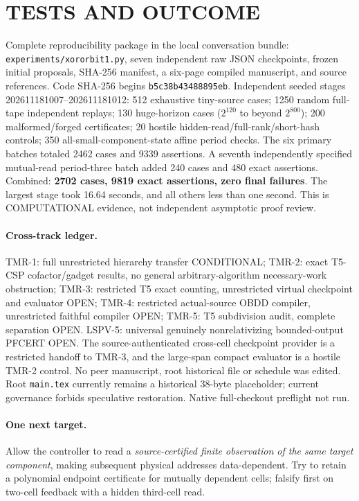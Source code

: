 \documentclass[11pt]{article}
\begin{document}
\section{TESTS AND OUTCOME}
Complete reproducibility package in the local conversation bundle:
\texttt{experiments/xororbit1.py}, seven independent raw JSON
checkpoints, frozen initial proposals, SHA-256 manifest,
a six-page compiled manuscript, and source references.
Code SHA-256 begins \texttt{b5c38b43488895eb}.
Independent seeded stages 202611181007--202611181012:
512 exhaustive tiny-source cases; 1250 random full-tape
independent replays; 130 huge-horizon cases
($2^{120}$ to beyond $2^{800}$); 200 malformed/forged
certificates; 20 hostile hidden-read/full-rank/short-hash controls;
350 all-small-component-state affine period checks.
The six primary batches totaled 2462 cases and 9339 assertions. A seventh independently specified mutual-read period-three batch added 240 cases and 480 exact assertions. Combined: \textbf{2702 cases, 9819 exact assertions, zero final failures}.
The largest stage took 16.64 seconds, and all others less than
one second. This is COMPUTATIONAL evidence, not independent
asymptotic proof review.

\paragraph{Cross-track ledger.} TMR-1: full unrestricted
hierarchy transfer CONDITIONAL; TMR-2: exact T5-CSP cofactor/gadget
results, no general arbitrary-algorithm necessary-work obstruction;
TMR-3: restricted T5 exact counting, unrestricted virtual checkpoint
and evaluator OPEN; TMR-4: restricted actual-source OBDD compiler,
unrestricted faithful compiler OPEN; TMR-5: T5 subdivision audit,
complete separation OPEN. LSPV-5: universal genuinely
nonrelativizing bounded-output PFCERT OPEN. The source-authenticated
cross-cell checkpoint provider is a restricted handoff to TMR-3,
and the large-span compact evaluator is a hostile TMR-2 control.
No peer manuscript, root historical file or schedule was edited.
Root \texttt{main.tex} currently remains a historical 38-byte
placeholder; current governance forbids speculative restoration.
Native full-checkout preflight not run.

\paragraph{One next target.} Allow the controller to read a
\emph{source-certified finite observation of the same target component},
making subsequent physical addresses data-dependent.
Try to retain a polynomial endpoint certificate for mutually
dependent cells; falsify first on two-cell feedback with a hidden
third-cell read.
\end{document}
